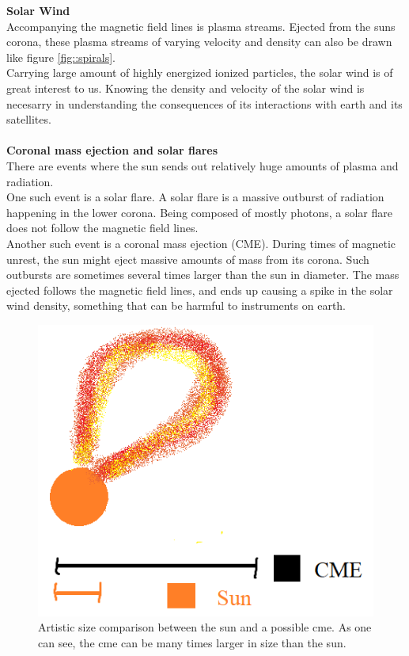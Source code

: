 \documentclass[norsk,a4paper,12pt]{article}
\begin{document}
		\textbf{Solar Wind}\\
		Accompanying the magnetic field lines is plasma streams. Ejected from the suns corona, these plasma streams of varying velocity and density can also                         		be drawn like figure \ref{fig::spirals}.\\
		Carrying large amount of highly energized ionized particles, the solar wind is of great interest to us. Knowing the density and velocity of the solar wind 				is necesarry in understanding the consequences of its interactions with earth and its satellites.\\
		\\
		\textbf{Coronal mass ejection and solar flares}\\
		There are events where the sun sends out relatively huge amounts of plasma and radiation.\\
		One such event is a solar flare. A solar flare is a massive outburst of radiation happening in the lower corona. Being composed of mostly photons, a 				solar flare does not follow the magnetic field lines.\\
		Another such event is a coronal mass ejection (CME). During times of magnetic unrest, the sun might eject massive amounts of mass from its corona. 				Such outbursts are sometimes several times larger than the sun in diameter. The mass ejected follows the magnetic field lines, and ends up causing a 		spike in the solar wind density, something that can be harmful to instruments on earth.
		\begin{figure}[H]
			\includegraphics[scale = 0.7]{Figures/artistic_cme.png}
			\centering
			\caption{Artistic size comparison between the sun and a possible cme. As one can see, the cme can be many times larger in size than the sun.}
			\label{fig::cme}
		\end{figure}
\end{document}
